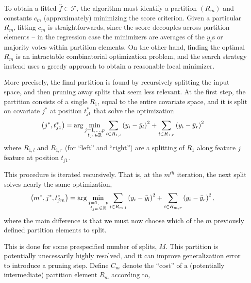 \documentclass{article}
\begin{document}
To obtain a fitted $\hat{f} \in \mathcal{F}$, the algorithm must identify a
partition $\left(R_{m}\right)$ and constants $c_{m}$ (approximately) minimizing
the score criterion. Given a particular $R_{m}$, fitting $c_{m}$ is
straightforwards, since the score decouples across partition elements -- in the
regression case the minimizers are averages of the $y_{i}$s or majority votes
within partition elements. On the other hand, finding the optimal $R_{m}$ is an
intractable combinatorial optimization problem, and the search strategy instead
uses a greedy approach to obtain a reasonable local minimizer.

More precisely, the final partition is found by recursively splitting the
input space, and then pruning away splits that seem less relevant. At the first
step, the partition consists of a single $R_{1}$, equal to the entire covariate
space, and it is split on covariate $j^{\ast}$ at position $t_{j1}^{\ast}$
that solve the optimization
\begin{align}
  \left(j^{\ast}, t_{j1}^{\ast}\right) &= \arg \min_{\substack{j = 1, \dots, p \\ t_{j1} \in \mathbb{R}}} \sum_{i \in R_{1, l}} \left(y_{i} - \bar{y}_{l}\right)^{2} + \sum_{i \in R_{1, r}} \left(y_{i} - \bar{y}_{r}\right)^{2}
\end{align}
where $R_{1, l}$ and $R_{1, r}$ (for ``left'' and ``right'') are a splitting of
$R_{1}$ along feature $j$ feature at position $t_{j1}$.

This procedure is iterated recursively. That is, at the $m^{th}$ iteration, the
next split solves nearly the same optimization,
\begin{align}
  \left(m^{\ast}, j^{\ast}, t_{jm}^{\ast}\right) &= \arg \min_{\substack{j = 1, \dots, p \\ t_{jm} \in \mathbb{R}}} \sum_{i \in R_{m, l}} \left(y_{i} - \bar{y}_{l}\right)^{2} + \sum_{i \in R_{m, r}} \left(y_{i} - \bar{y}_{r}\right)^{2},
\end{align}
where the main difference is that we must now choose which of the $m$ previously
defined partition elements to split.

This is done for some prespecified number of splits, $M$. This partition is
potentially unecessarily highly resolved, and it can improve generalization
error to introduce a pruning step. Define $C_{m}$ denote the ``cost'' of a
(potentially intermediate) partition element $R_{m}$ according to,
\end{document}
